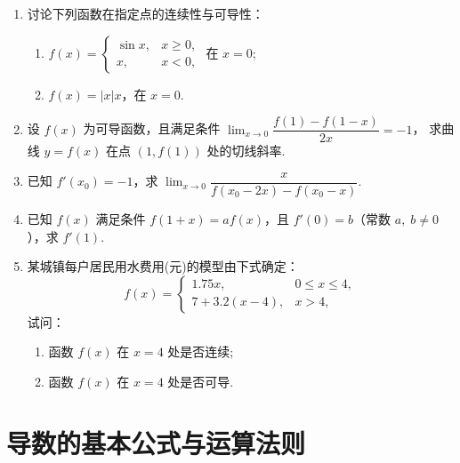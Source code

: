 \begin{enumerate}
    \item 讨论下列函数在指定点的连续性与可导性：
    \begin{enumerate}[(1)]\setlength{\itemsep}{5pt}\setlength{\topsep}{15pt}
        \item $f(x)=\begin{cases}
            \sin x,&x\geqslant0,\\
            x,&x<0,
        \end{cases}$ 在 $x=0$;
        \item $f(x)=|x|x$，在 $x=0$.
    \end{enumerate}

    \item 设 $f(x)$ 为可导函数，且满足条件 $\displaystyle\lim_{x\to0}\dfrac{f(1)-f(1-x)}{2x}=-1$，
    求曲线 $y=f(x)$ 在点 $(1,f(1))$ 处的切线斜率.

    \item 已知 $f'(x_0)=-1$，求 $\displaystyle\lim_{x\to0}\dfrac{x}{f(x_0-2x)-f(x_0-x)}$.
    
    \item 已知 $f(x)$ 满足条件 $f(1+x)=af(x)$，且 $f'(0)=b$（常数 $a,\;b\not=0$），求 $f'(1)$.
    
    \item 某城镇每户居民用水费用(元)的模型由下式确定：
    \[
        f(x)=\begin{cases}
            1.75x,&0\leqslant x\leqslant 4,\\
            7+3.2(x-4),&x>4,
        \end{cases}
    \]
    试问：\begin{minipage}[t]{10cm}
            \begin{enumerate}[(1)]
            \item 函数 $f(x)$ 在 $x=4$ 处是否连续;
            \item 函数 $f(x)$ 在 $x=4$ 处是否可导.
            \end{enumerate}
        \end{minipage}
\end{enumerate}

\section{导数的基本公式与运算法则}

